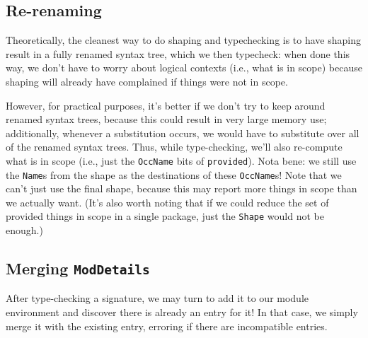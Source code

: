 \documentclass{article}
\begin{document}
\subsection{Re-renaming}

Theoretically, the cleanest way to do shaping and typechecking is to have shaping
result in a fully renamed syntax tree, which we then typecheck: when done this way,
we don't have to worry about logical contexts (i.e., what is in scope) because
shaping will already have complained if things were not in scope.

However, for practical purposes, it's better if we don't try to keep
around renamed syntax trees, because this could result in very large
memory use; additionally, whenever a substitution occurs, we would have
to substitute over all of the renamed syntax trees.  Thus, while
type-checking, we'll also re-compute what is in scope (i.e.,  just the
\verb|OccName| bits of \verb|provided|). Nota bene: we still use the
\verb|Name|s from the shape as the destinations of these
\verb|OccName|s!  Note that we can't just use the final shape, because
this may report more things in scope than we actually want.  (It's also
worth noting that if we could reduce the set of provided things in
scope in a single package, just the \verb|Shape| would not be enough.)

\subsection{Merging \texttt{ModDetails}}

After type-checking a signature, we may turn to add it to our module
environment and discover there is already an entry for it!  In that case,
we simply merge it with the existing entry, erroring if there are incompatible
entries.
\end{document}
